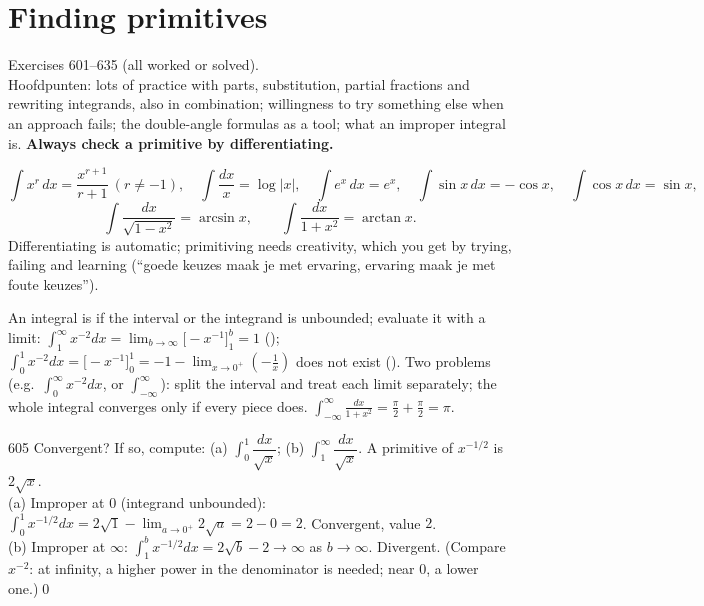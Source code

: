\chapter{Finding primitives}
%
{Exercises 601--635 (all worked or solved).\\ Hoofdpunten: lots of practice with parts, substitution, partial fractions and rewriting integrands, also in combination; willingness to try something else when an approach fails; the double-angle formulas as a tool; what an improper integral is. \textbf{Always check a primitive by differentiating.}}

\begin{key}
\[
\int x^r\,dx=\frac{x^{r+1}}{r+1}\ (r\ne-1),\quad\int\frac{dx}x=\log|x|,\quad\int e^x\,dx=e^x,\quad\int\sin x\,dx=-\cos x,\quad\int\cos x\,dx=\sin x,
\]
\[
\int\frac{dx}{\sqrt{1-x^2}}=\arcsin x,\qquad\int\frac{dx}{1+x^2}=\arctan x.
\]
Differentiating is automatic; primitiving needs creativity, which you get by trying, failing and learning (``goede keuzes maak je met ervaring, ervaring maak je met foute keuzes'').
\end{key}
\begin{key}
An integral is  if the interval or the integrand is unbounded; evaluate it with a limit: $\int_1^\infty x^{-2}dx=\lim_{b\to\infty}\big[-x^{-1}\big]_1^b=1$ (); $\int_0^1x^{-2}dx=\big[-x^{-1}\big]_0^1=-1-\lim_{x\to0^+}(-\tfrac1x)$ does not exist (). Two problems (e.g.\ $\int_0^\infty x^{-2}dx$, or $\int_{-\infty}^\infty$): split the interval and treat each limit separately; the whole integral converges only if every piece does. $\int_{-\infty}^\infty\frac{dx}{1+x^2}=\frac\pi2+\frac\pi2=\pi$.
\end{key}

\begin{bookex}{605}
Convergent? If so, compute: (a) $\int_0^1\dfrac{dx}{\sqrt x}$; (b) $\int_1^\infty\dfrac{dx}{\sqrt x}$.
\solution
A primitive of $x^{-1/2}$ is $2\sqrt x$.\\
(a) Improper at $0$ (integrand unbounded): $\int_0^1x^{-1/2}dx=2\sqrt1-\lim_{a\to0^+}2\sqrt a=2-0=2$. Convergent, value $2$.\\
(b) Improper at $\infty$: $\int_1^bx^{-1/2}dx=2\sqrt b-2\to\infty$ as $b\to\infty$. Divergent. (Compare $x^{-2}$: at infinity, a higher power in the denominator is needed; near $0$, a lower one.)\qed
\end{bookex}

